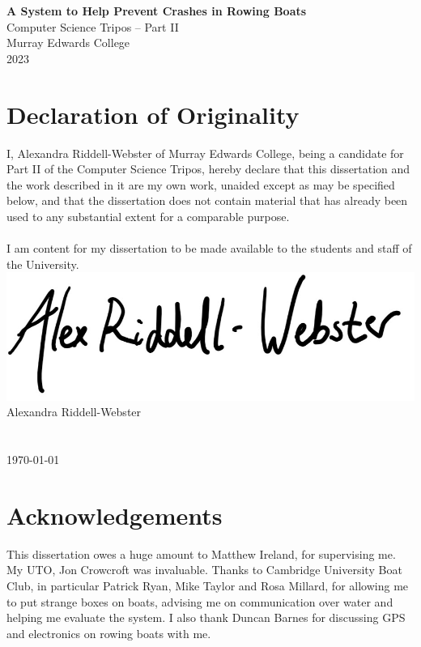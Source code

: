 \documentclass[12pt,a4paper]{report}
\begin{document}
\thispagestyle{empty}


\vspace*{60mm}
\begin{center}
\Huge
\textbf{A System to Help Prevent Crashes in Rowing Boats} \\[5mm]
Computer Science Tripos -- Part II \\[5mm]
Murray Edwards College \\[5mm]
2023
\end{center}

\pagestyle{plain}
\chapter*{Declaration of Originality}

I, Alexandra Riddell-Webster of Murray Edwards College, being a candidate for Part II of the Computer Science Tripos, hereby declare that this dissertation and the work described in it are my own work, unaided except as may be specified below, and that the dissertation does not contain material that has already been used to any substantial extent for a comparable purpose. \\ \\
I am content for my dissertation to be made available to the students and staff of the University. \\

\bigskip
{}
\includegraphics[scale=0.4]{sig.jpg} \\
Alexandra Riddell-Webster \\ \\
 \\ 
\today

\chapter*{Acknowledgements}
This dissertation owes a huge amount to Matthew Ireland, for supervising me. My UTO, Jon Crowcroft was invaluable. Thanks to Cambridge University Boat Club, in particular Patrick Ryan, Mike Taylor and Rosa Millard, for allowing me to put strange boxes on boats, advising me on communication over water and helping me evaluate the system. I also thank Duncan Barnes for discussing GPS and electronics on rowing boats with me.
\end{document}
